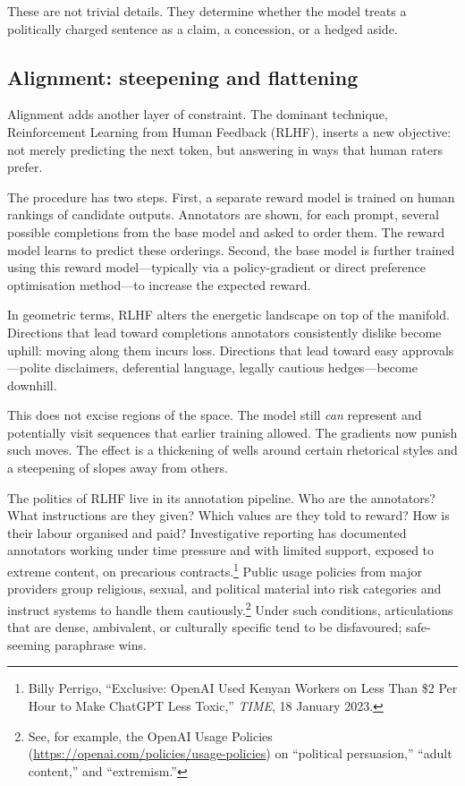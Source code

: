 \documentclass[12pt,a4paper]{article}
\begin{document}
These are not trivial details. They determine whether the model treats a politically charged sentence as a claim, a concession, or a hedged aside.

\subsection*{Alignment: steepening and flattening}

Alignment adds another layer of constraint. The dominant technique, Reinforcement Learning from Human Feedback (RLHF), inserts a new objective: not merely predicting the next token, but answering in ways that human raters prefer.

The procedure has two steps. First, a separate reward model is trained on human rankings of candidate outputs. Annotators are shown, for each prompt, several possible completions from the base model and asked to order them. The reward model learns to predict these orderings. Second, the base model is further trained using this reward model---typically via a policy-gradient or direct preference optimisation method---to increase the expected reward.

In geometric terms, RLHF alters the energetic landscape on top of the manifold. Directions that lead toward completions annotators consistently dislike become uphill: moving along them incurs loss. Directions that lead toward easy approvals---polite disclaimers, deferential language, legally cautious hedges---become downhill.

This does not excise regions of the space. The model still \emph{can} represent and potentially visit sequences that earlier training allowed. The gradients now punish such moves. The effect is a thickening of wells around certain rhetorical styles and a steepening of slopes away from others.

The politics of RLHF live in its annotation pipeline. Who are the annotators? What instructions are they given? Which values are they told to reward? How is their labour organised and paid? Investigative reporting has documented annotators working under time pressure and with limited support, exposed to extreme content, on precarious contracts.\footnote{Billy Perrigo, ``Exclusive: OpenAI Used Kenyan Workers on Less Than \$2 Per Hour to Make ChatGPT Less Toxic,'' \emph{TIME}, 18 January 2023.} Public usage policies from major providers group religious, sexual, and political material into risk categories and instruct systems to handle them cautiously.\footnote{See, for example, the OpenAI Usage Policies (\url{https://openai.com/policies/usage-policies}) on ``political persuasion,'' ``adult content,'' and ``extremism.''} Under such conditions, articulations that are dense, ambivalent, or culturally specific tend to be disfavoured; safe-seeming paraphrase wins.
\end{document}
